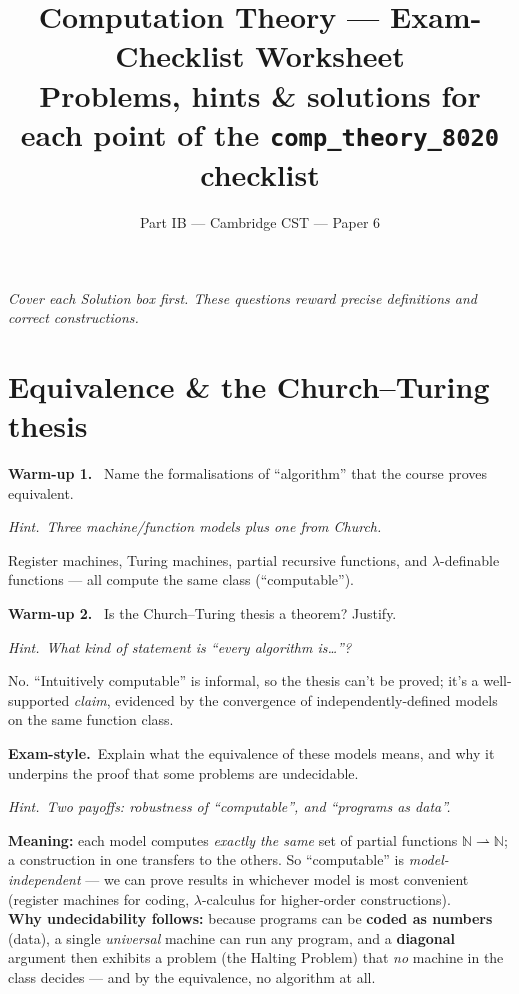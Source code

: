 \documentclass[11pt,a4paper]{article}
\title{\vspace{-1.5cm}\textbf{Computation Theory --- Exam-Checklist Worksheet}\\[2pt]
\large Problems, hints \& solutions for each point of the \texttt{comp\_theory\_8020} checklist}
\author{\small Part IB --- Cambridge CST --- Paper 6}
\date{}
\newcommand{\hint}[1]{\par{\small\textcolor{accent}{\textit{Hint.}}\ \textit{#1}}\par\smallskip}
\newcommand{\warm}[1]{\smallskip\textbf{\textcolor{hi}{Warm-up #1.}}\ }
\newcommand{\exam}{\smallskip\textbf{\textcolor{warn}{Exam-style.}}\ }
\begin{document}
\maketitle
\vspace{-0.8cm}
\textit{Cover each Solution box first. These questions reward precise definitions and correct constructions.}

\hrulefill

\section{Equivalence \& the Church--Turing thesis}

\warm{1} Name the formalisations of ``algorithm'' that the course proves equivalent.
\hint{Three machine/function models plus one from Church.}
\begin{sol}Register machines, Turing machines, partial recursive functions, and $\lambda$-definable functions --- all compute the same class (``computable'').\end{sol}

\warm{2} Is the Church--Turing thesis a theorem? Justify.
\hint{What kind of statement is ``every algorithm is\dots''?}
\begin{sol}No. ``Intuitively computable'' is informal, so the thesis can't be proved; it's a well-supported \emph{claim}, evidenced by the convergence of independently-defined models on the same function class.\end{sol}

\exam Explain what the equivalence of these models means, and why it underpins the proof that some problems are undecidable.
\hint{Two payoffs: robustness of ``computable'', and ``programs as data''.}
\begin{sol}
\textbf{Meaning:} each model computes \emph{exactly the same} set of partial functions $\mathbb N\rightharpoonup\mathbb N$; a construction in one transfers to the others. So ``computable'' is \emph{model-independent} --- we can prove results in whichever model is most convenient (register machines for coding, $\lambda$-calculus for higher-order constructions).\\[2pt]
\textbf{Why undecidability follows:} because programs can be \textbf{coded as numbers} (data), a single \emph{universal} machine can run any program, and a \textbf{diagonal} argument then exhibits a problem (the Halting Problem) that \emph{no} machine in the class decides --- and by the equivalence, no algorithm at all.
\end{sol}
\end{document}
